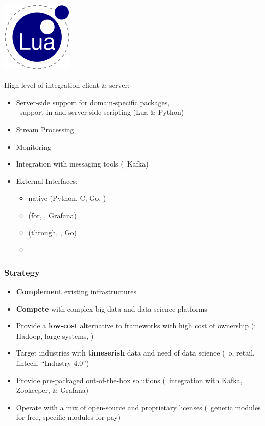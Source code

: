 \documentclass[mathserif,usenames,dvipsnames]{beamer}
\begin{document}
\begin{frame}
\frametitle{ \includegraphics[width=0.15\linewidth]{../img/lualogo.png}}
High level of integration client \& server:
\begin{itemize}
\item Server-side support for domain-specific packages,\\
      \ie\ support in  and server-side scripting
      (Lua \& Python)
\item Stream Processing
\item Monitoring
\item Integration with messaging tools (\eg\ Kafka)
\item External Interfaces:
\begin{itemize}
\item native (Python, C, Go, \etc)
\item {} (for, \eg, Grafana)
\item {} (through, \eg, Go)
\item {}
\end{itemize}
\end{itemize}
\end{frame}

\begin{frame}
\frametitle{Strategy}
\begin{itemize}
\item \textbf{Complement} existing  infrastructures
\item \textbf{Compete} with complex big-data and data science platforms
\item Provide a \textbf{low-cost} alternative 
      to frameworks with high cost of ownership
      (\eg: Hadoop, large  systems, \etc)
\item Target industries with \textbf{timeserish} data 
      and need of data science
      (\eg\ o, retail, fintech, ``Industry 4.0'')
\item Provide pre-packaged out-of-the-box solutions
      (\eg\ integration with Kafka, Zookeeper,  \& Grafana)
\item Operate with a mix of open-source and proprietary licenses
      (\eg\ generic modules for free, specific modules for pay)
\end{itemize}
\end{frame}
\end{document}

